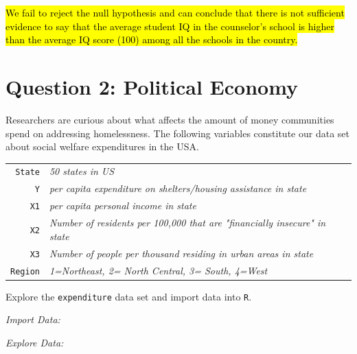 \documentclass[12pt,letterpaper]{article}
\begin{document}
\begin{enumerate}
		\hl{We fail to reject the null hypothesis and can conclude that there is not sufficient evidence to say that the average student IQ in the counselor's school is higher than the average IQ score (100) among all the schools in the country.}
		
	\end{enumerate}
	
	\newpage
	
	\section*{Question 2: Political Economy}
	
	\noindent Researchers are curious about what affects the amount of money communities spend on addressing homelessness. The following variables constitute our data set about social welfare expenditures in the USA. \\

	\begin{tabular}{r|l}
		\texttt{State} &\emph{50 states in US} \\
		\texttt{Y} & \emph{per capita expenditure on shelters/housing assistance in state}\\
		\texttt{X1} &\emph{per capita personal income in state} \\
		\texttt{X2} &  \emph{Number of residents per 100,000 that are "financially insecure" in state}\\
		\texttt{X3} &  \emph{Number of people per thousand residing in urban areas in state} \\
		\texttt{Region} &  \emph{1=Northeast, 2= North Central, 3= South, 4=West} \\
	\end{tabular}
	
	\vspace{.5cm}
	\noindent Explore the \texttt{expenditure} data set and import data into \texttt{R}.
	\vspace{.5cm}
	
	\textit{Import Data:}
	
	
	\textit{Explore Data:}
	
	
\end{document}
